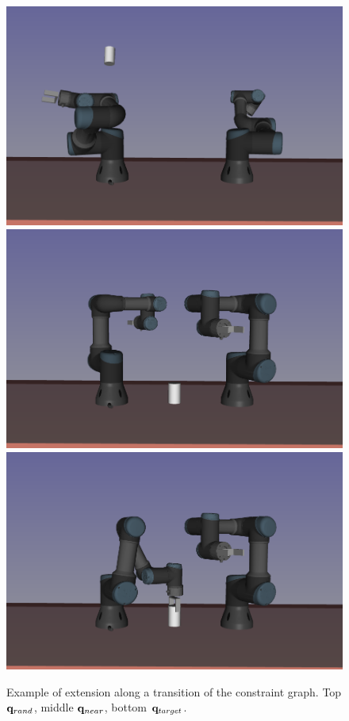 \begin{figure}
  \begin{center}
    \includegraphics[width=\linewidth]{figures/example-qrand-2.png}
    \includegraphics[width=\linewidth]{figures/example-q0-2.png}
    \includegraphics[width=\linewidth]{figures/example-q-wp-2.png}
  \end{center}
  \caption{Example of extension along a transition of the constraint graph. Top
    $\mathbf{q}_{rand}$, middle $\mathbf{q}_{near}$, bottom $\mathbf{q}_{target}$.
  }
  \label{fig:MRRT-extension}
\end{figure}

